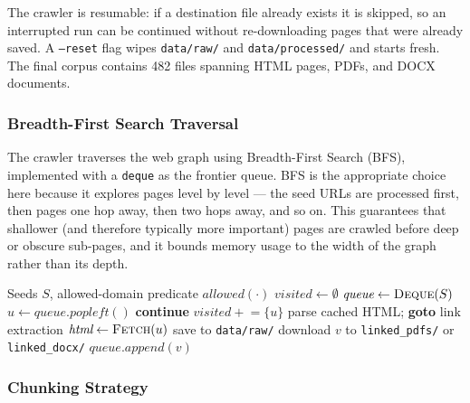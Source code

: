 The crawler is resumable: if a destination file already exists it is skipped, so an interrupted run can be continued without re-downloading pages that were already saved. A \texttt{--reset} flag wipes \texttt{data/raw/} and \texttt{data/processed/} and starts fresh. The final corpus contains 482 files spanning HTML pages, PDFs, and DOCX documents.

\subsubsection*{Breadth-First Search Traversal}

The crawler traverses the web graph using Breadth-First Search (BFS), implemented with a \texttt{deque} as the frontier queue. BFS is the appropriate choice here because it explores pages level by level — the seed URLs are processed first, then pages one hop away, then two hops away, and so on. This guarantees that shallower (and therefore typically more important) pages are crawled before deep or obscure sub-pages, and it bounds memory usage to the width of the graph rather than its depth.

\begin{algorithm}[H]
\caption{BFS Web Crawler}
\label{alg:bfs-crawler}
\begin{algorithmic}[1]
\Require Seeds $S$, allowed-domain predicate $\textit{allowed}(\cdot)$
\State $\textit{visited} \gets \emptyset$
\State $\textit{queue} \gets \textsc{Deque}(S)$
    \State $u \gets \textit{queue.popleft}()$
     \textbf{continue} \EndIf
    \State $\textit{visited} \mathrel{+}= \{u\}$
     parse cached HTML; \textbf{goto} link extraction \EndIf
    \State $\textit{html} \gets \textsc{Fetch}(u)$
     save to \texttt{data/raw/} \EndIf
            \State download $v$ to \texttt{linked\_pdfs/} or \texttt{linked\_docx/}
            \State $\textit{queue.append}(v)$
        \EndIf
    \EndFor
\EndWhile
\end{algorithmic}
\end{algorithm}

\subsubsection{Chunking Strategy}

